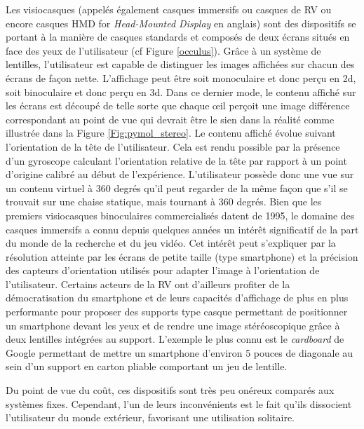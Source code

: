 Les visiocasques (appelés également casques immersifs ou casques de RV ou encore casques HMD for \textit{Head-Mounted Display} en anglais) sont des dispositifs se portant à la manière de casques standards et composés de deux écrans situés en face des yeux de l'utilisateur (cf Figure \ref{occulus}). Grâce à un système de lentilles, l'utilisateur est capable de distinguer les images affichées sur chacun des écrans de façon nette. L'affichage peut être soit monoculaire et donc perçu en 2d, soit binoculaire et donc perçu en 3d. Dans ce dernier mode, le contenu affiché sur les écrans est découpé de telle sorte que chaque œil perçoit une image différence correspondant au point de vue qui devrait être le sien dans la réalité comme illustrée dans la Figure \ref{Fig:pymol_stereo}. Le contenu affiché évolue suivant l'orientation de la tête de l'utilisateur. Cela est rendu possible par la présence d'un gyroscope calculant l'orientation relative de la tête par rapport à un point d'origine calibré au début de l'expérience. L'utilisateur possède donc une vue sur un contenu virtuel à 360 degrés qu'il peut regarder de la même façon que s'il se trouvait sur une chaise statique, mais tournant à 360 degrés. Bien que les premiers visiocasques binoculaires commercialisés datent de 1995, le domaine des casques immersifs a connu depuis quelques années un intérêt significatif de la part du monde de la recherche et du jeu vidéo. Cet intérêt peut s'expliquer par la résolution atteinte par les écrans de petite taille (type smartphone) et la précision des capteurs d'orientation utilisés pour adapter l'image à l'orientation de l'utilisateur. Certains acteurs de la RV ont d'ailleurs profiter de la démocratisation du smartphone et de leurs capacités d'affichage de plus en plus performante pour proposer des supports type casque permettant de positionner un smartphone devant les yeux et de rendre une image stéréoscopique grâce à deux lentilles intégrées au support. L'exemple le plus connu est le \textit{cardboard} de Google permettant de mettre un smartphone d'environ 5 pouces de diagonale au sein d'un support en carton pliable comportant un jeu de lentille. 

Du point de vue du coût, ces dispositifs sont très peu onéreux comparés aux systèmes fixes. Cependant, l'un de leurs inconvénients est le fait qu'ils dissocient l'utilisateur du monde extérieur, favorisant une utilisation solitaire.

